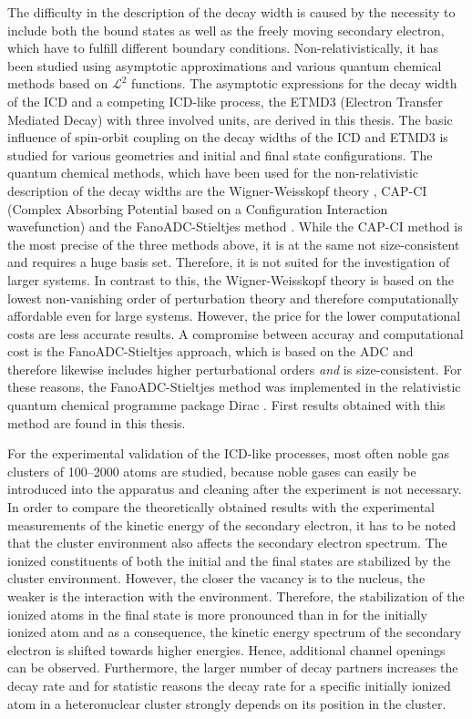 The difficulty in the description of the decay width is caused by
the necessity to include both the bound states as well as the freely
moving secondary electron, which have to fulfill different boundary conditions.
Non-relativistically, it has been studied using asymptotic
approximations \cite{Gokhberg10_1} and various quantum chemical methods based
on $\mathcal{L}^2$ functions.
The asymptotic expressions for the decay width of the \ac{ICD} and a competing
\ac{ICD}-like process, the ETMD3 (Electron Transfer Mediated Decay) with three
involved units, are derived in this thesis. The basic influence of
spin-orbit coupling on the decay widths of the \ac{ICD} and ETMD3 is studied
for various geometries and initial and final state configurations.
The quantum chemical methods, which have been used for the non-relativistic 
description of the decay widths are the Wigner-Weisskopf theory \cite{Santra02},
CAP-CI
(Complex Absorbing Potential based on a Configuration Interaction wavefunction)
\cite{SakuraiModern94,Santra01_3} and the FanoADC-Stieltjes method
\cite{Averbukh05}.
While the CAP-CI method is the most precise of the three methods above,
it is at the same
not size-consistent and requires a huge basis set. Therefore, it is not
suited for the investigation of larger systems. In contrast to this, the
Wigner-Weisskopf theory is based on the lowest non-vanishing order of perturbation
theory and therefore computationally affordable even for large systems.
However, the price for the lower
computational costs are less accurate results. A compromise between
accuray and computational cost is the FanoADC-Stieltjes approach, which
is based on the \ac{ADC} and therefore
likewise includes
higher perturbational orders \emph{and} is size-consistent.
For these reasons,
the FanoADC-Stieltjes method was implemented in the relativistic
quantum chemical programme package Dirac \cite{DIRAC13}. First results
obtained with this method are found in this thesis.

For the experimental validation of the \ac{ICD}-like processes, most often
noble gas clusters of 100--2000 atoms are studied, because noble gases can
easily be introduced into the apparatus and cleaning after the experiment is
not necessary. In order to compare the
theoretically obtained results with the experimental measurements of the
kinetic energy of the secondary electron, it has
to be noted that the cluster environment also affects the secondary electron
spectrum.
The ionized constituents of both the initial and the final states are stabilized
by the cluster environment. However, the closer the vacancy is to the nucleus,
the weaker is the interaction with the environment.
Therefore, the stabilization of the ionized atoms in the final state is more
pronounced than in for the initially ionized atom and as a consequence, the
kinetic energy spectrum of the secondary electron is shifted towards higher
energies.
Hence, additional channel openings can be observed.
Furthermore, the larger number of decay partners increases the decay rate
and for statistic reasons the decay rate for a specific initially ionized
atom in a heteronuclear cluster strongly depends on its position in the cluster.

